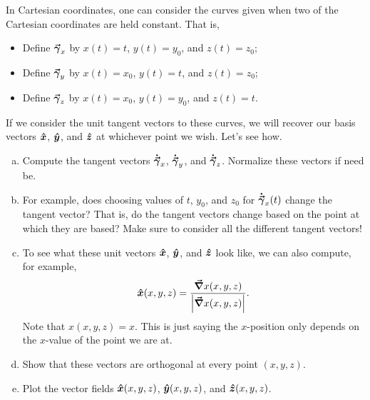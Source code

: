 \documentclass[12pt]{article} %
\begin{document}
\vspace*{1cm}
\begin{problem}
In Cartesian coordinates, one can consider the curves given when two of the Cartesian coordinates are held constant. That is,
\begin{itemize}
    \item Define $\boldsymbol{\vec{\gamma}}_x$ by $x(t)=t$, $y(t)=y_0$, and $z(t)=z_0$;
    \item Define $\boldsymbol{\vec{\gamma}}_y$ by $x(t)=x_0$, $y(t)=t$, and $z(t)=z_0$;
    \item Define $\boldsymbol{\vec{\gamma}}_z$ by $x(t)=x_0$, $y(t)=y_0$, and $z(t)=t$.
\end{itemize}
If we consider the unit tangent vectors to these curves, we will recover our basis vectors $\boldsymbol{\hat{x}}$, $\boldsymbol{\hat{y}}$, and $\boldsymbol{\hat{z}}$ at whichever point we wish.  Let's see how.
\begin{enumerate}[(a)]
    \item Compute the tangent vectors $\boldsymbol{\dot{\vec{\gamma}}}_x$, $\boldsymbol{\dot{\vec{\gamma}}}_y$, and $\boldsymbol{\dot{\vec{\gamma}}}_z$.  Normalize these vectors if need be.
    \item For example, does choosing values of $t$, $y_0$, and $z_0$ for $\boldsymbol{\dot{\vec{\gamma}}}_x(t)$ change the tangent vector? That is, do the tangent vectors change based on the point at which they are based? Make sure to consider all the different tangent vectors!
    \item To see what these unit vectors $\boldsymbol{\hat{x}}$, $\boldsymbol{\hat{y}}$, and $\boldsymbol{\hat{z}}$ look like, we can also compute, for example,
        \[
        \boldsymbol{\hat{x}}(x,y,z) = \frac{\boldsymbol{\vec{\nabla}} x(x,y,z)}{\left| \boldsymbol{\vec{\nabla}} x(x,y,z)\right|}.
        \]
        Note that $x(x,y,z)=x$. This is just saying the $x$-position only depends on the $x$-value of the point we are at.
    \item Show that these vectors are orthogonal at every point $(x,y,z)$.
    \item Plot the vector fields $\boldsymbol{\hat{x}}(x,y,z)$, $\boldsymbol{\hat{y}}(x,y,z)$, and $\boldsymbol{\hat{z}}(x,y,z)$.
\end{enumerate}
\end{problem}
\end{document}
